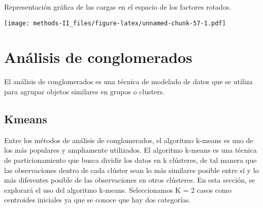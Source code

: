 \documentclass[
]{article}
\newenvironment{Shaded}{\begin{snugshade}}{\end{snugshade}}
\newcommand{\AttributeTok}[1]{\textcolor[rgb]{0.77,0.63,0.00}{#1}}
\newcommand{\DecValTok}[1]{\textcolor[rgb]{0.00,0.00,0.81}{#1}}
\newcommand{\FunctionTok}[1]{\textcolor[rgb]{0.00,0.00,0.00}{#1}}
\newcommand{\NormalTok}[1]{#1}
\newcommand{\OtherTok}[1]{\textcolor[rgb]{0.56,0.35,0.01}{#1}}
\newcommand{\SpecialCharTok}[1]{\textcolor[rgb]{0.00,0.00,0.00}{#1}}
\newcommand{\StringTok}[1]{\textcolor[rgb]{0.31,0.60,0.02}{#1}}
\begin{document}
Representación gráfica de las cargas en el espacio de los factores
rotados.

\begin{Shaded}
\end{Shaded}

\texttt{[image: methods-II\_files/figure-latex/unnamed-chunk-57-1.pdf]}

\hypertarget{anuxe1lisis-de-conglomerados}{%
\section{Análisis de conglomerados}\label{anuxe1lisis-de-conglomerados}}

El análisis de conglomerados es una técnica de modelado de datos que se
utiliza para agrupar objetos similares en grupos o clusters.

\hypertarget{kmeans}{%
\subsection{Kmeans}\label{kmeans}}

Entre los métodos de análisis de conglomerados, el algoritmo k-means es
uno de los más populares y ampliamente utilizados. El algoritmo k-means
es una técnica de particionamiento que busca dividir los datos en k
clústeres, de tal manera que las observaciones dentro de cada clúster
sean lo más similares posible entre sí y lo más diferentes posible de
las observaciones en otros clústeres. En esta sección, se explorará el
uso del algoritmo k-means. Seleccionamos K = 2 casos como centroides
iniciales ya que se conoce que hay dos categorías.
\end{document}

